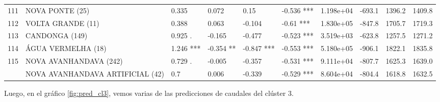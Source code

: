 \documentclass[12pt,oneside]{book}\usepackage[]{graphicx}\usepackage[]{color}
\newenvironment{knitrout}{}{} %
\theoremstyle{definition} %
\begin{document}
\begin{knitrout}
\begin{table}
{\begin{tabular}[t]{llllllrrrr}
\addlinespace
\rowcolor{gray!6}  111 & NOVA PONTE (25) & 0.335 & 0.072 & 0.15 & -0.536 *** & 1.198e+04 & -693.1 & 1396.2 & 1409.8\\
112 & VOLTA GRANDE (11) & 0.388 & 0.063 & -0.104 & -0.61 *** & 1.830e+05 & -847.8 & 1705.7 & 1719.3\\
\rowcolor{gray!6}  113 & CANDONGA (149) & 0.925 . & -0.165 & -0.477 & -0.523 *** & 3.519e+03 & -623.8 & 1257.5 & 1271.2\\
114 & ÁGUA VERMELHA (18) & 1.246 *** & -0.354 ** & -0.847 *** & -0.553 *** & 5.180e+05 & -906.1 & 1822.1 & 1835.8\\
\rowcolor{gray!6}  115 & NOVA AVANHANDAVA (242) & 0.729 . & -0.005 & -0.357 & -0.531 *** & 9.111e+04 & -807.7 & 1625.3 & 1639.0\\
\addlinespace
116 & NOVA AVANHANDAVA ARTIFICIAL (42) & 0.7 & 0.006 & -0.339 & -0.529 *** & 8.604e+04 & -804.4 & 1618.8 & 1632.5\\
\bottomrule
\end{tabular}}
\end{table}


\end{knitrout}


Luego, en el gráfico \ref{fig:pred_cl3}, vemos varias de las predicciones de caudales del clúster 3.
\end{document}
